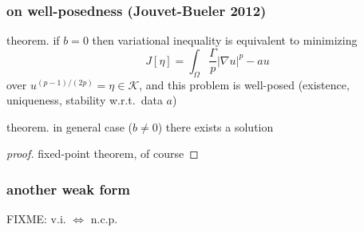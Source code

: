 \documentclass[hide notes,intlimits]{beamer}
\newcommand{\Kcal}{\mathcal{K}}
\newcommand{\grad}{\nabla}
\begin{document}
\begin{frame}
  \frametitle{on well-posedness (Jouvet-Bueler 2012)} 

\begin{block}{theorem.}
if $b=0$ then variational inequality is equivalent to minimizing
  $$J[\eta] = \int_{\Omega} \frac{\Gamma}{p} |\grad u|^p - a u$$
over $u^{(p-1)/(2p)} = \eta \in \Kcal$, and this problem is well-posed (existence, uniqueness, stability w.r.t.~data $a$)
\end{block}

\begin{block}{theorem.}
in general case ($b\ne 0$) there exists a solution
\end{block}

\begin{proof}[proof]
fixed-point theorem, of course
\end{proof}
\end{frame}


\begin{frame}
  \frametitle{another weak form} 

FIXME: v.i. $\iff$ n.c.p.
\end{frame}
\end{document}
